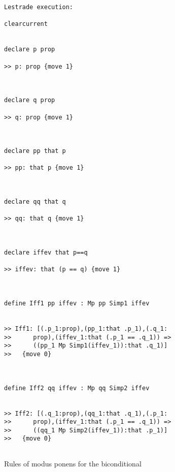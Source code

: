 \documentclass[12pt]{article}
\begin{document}
\begin{verbatim}Lestrade execution:

clearcurrent


declare p prop

>> p: prop {move 1}



declare q prop

>> q: prop {move 1}



declare pp that p

>> pp: that p {move 1}



declare qq that q

>> qq: that q {move 1}



declare iffev that p==q

>> iffev: that (p == q) {move 1}



define Iff1 pp iffev : Mp pp Simp1 iffev


>> Iff1: [(.p_1:prop),(pp_1:that .p_1),(.q_1:
>>      prop),(iffev_1:that (.p_1 == .q_1)) =>
>>      ((pp_1 Mp Simp1(iffev_1)):that .q_1)]
>>   {move 0}



define Iff2 qq iffev : Mp qq Simp2 iffev


>> Iff2: [(.q_1:prop),(qq_1:that .q_1),(.p_1:
>>      prop),(iffev_1:that (.p_1 == .q_1)) =>
>>      ((qq_1 Mp Simp2(iffev_1)):that .p_1)]
>>   {move 0}


\end{verbatim}

Rules of modus ponens for the biconditional
\end{document}
